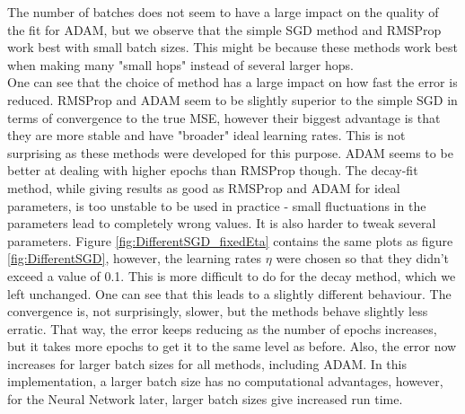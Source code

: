 \documentclass[11pt,a4paper,titlepage]{article}
\begin{document}
The number of batches does not seem to have a large impact on the quality of the fit for  ADAM, but we observe that the simple SGD method and RMSProp work best with small batch sizes. This might be because these methods work best when making many "small hops" instead of several larger hops.\\
One can see that the choice of method has a large impact on how fast the error is reduced. RMSProp and ADAM seem to be slightly superior to the simple SGD in terms of convergence to the true MSE, however their biggest advantage is that they are more stable and have "broader" ideal learning rates. This is not surprising as these methods were developed for this purpose. ADAM seems to be better at dealing with higher epochs than RMSProp though. The decay-fit method, while giving results as good as RMSProp and ADAM for ideal parameters, is too unstable to be used in practice - small fluctuations in the parameters lead to completely wrong values. It is also harder to tweak several parameters. 
Figure \ref{fig:DifferentSGD_fixedEta} contains the same plots as figure \ref{fig:DifferentSGD}, however, the learning rates $\eta$ were chosen so that they didn't exceed a value of 0.1. This is more difficult to do for the decay method, which we left unchanged. One can see that this leads to a slightly different behaviour. The convergence is, not surprisingly, slower, but the methods behave slightly less erratic. That way, the error keeps reducing as the number of epochs increases, but it takes more epochs to get it to the same level as before. Also, the error now increases for larger batch sizes for all methods, including ADAM. In this implementation, a larger batch size has no computational advantages, however, for the Neural Network later, larger batch sizes give increased run time. 
\end{document}
